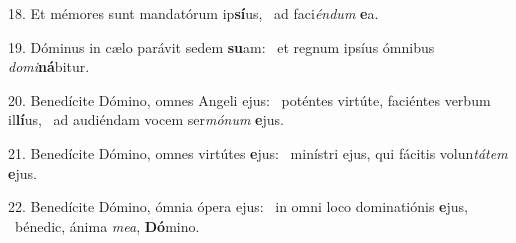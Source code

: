 18. Et mémores sunt mandatórum ip\textbf{sí}us, \ast\  ad faci\textit{én}\textit{dum} \textbf{e}a.\

19. Dóminus in cælo parávit sedem \textbf{su}am: \ast\  et regnum ipsíus ómnibus \textit{do}\textit{mi}\textbf{ná}bitur.\

20. Benedícite Dómino, omnes Angeli ejus: \dag\  poténtes virtúte, faciéntes verbum il\textbf{lí}us, \ast\  ad audiéndam vocem ser\textit{mó}\textit{num} \textbf{e}jus.\

21. Benedícite Dómino, omnes virtútes \textbf{e}jus: \ast\  minístri ejus, qui fácitis volun\textit{tá}\textit{tem} \textbf{e}jus.\

22. Benedícite Dómino, ómnia ópera ejus: \dag\  in omni loco dominatiónis \textbf{e}jus, \ast\  bénedic, ánima \textit{me}\textit{a}, \textbf{Dó}mino.\

